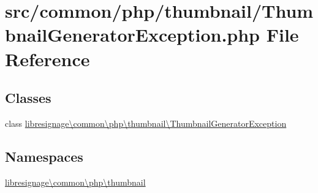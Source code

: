 \hypertarget{ThumbnailGeneratorException_8php}{}\section{src/common/php/thumbnail/\+Thumbnail\+Generator\+Exception.php File Reference}
\label{ThumbnailGeneratorException_8php}
\subsection*{Classes}
\begin{DoxyCompactItemize}
\item 
class \hyperlink{classlibresignage_1_1common_1_1php_1_1thumbnail_1_1ThumbnailGeneratorException}{libresignage\textbackslash{}common\textbackslash{}php\textbackslash{}thumbnail\textbackslash{}\+Thumbnail\+Generator\+Exception}
\end{DoxyCompactItemize}
\subsection*{Namespaces}
\begin{DoxyCompactItemize}
\item 
 \hyperlink{namespacelibresignage_1_1common_1_1php_1_1thumbnail}{libresignage\textbackslash{}common\textbackslash{}php\textbackslash{}thumbnail}
\end{DoxyCompactItemize}
